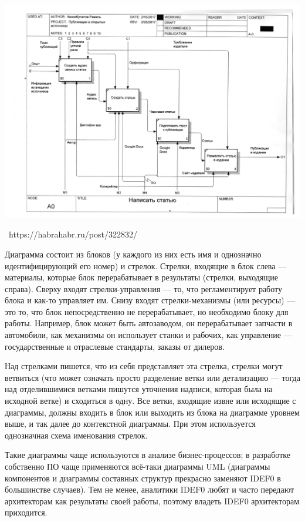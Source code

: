 \documentclass[a5paper]{article}
\newcommand{\attribution}[1] {
    \vspace{-5mm}\begin{flushright}\begin{scriptsize}%
    {\textcopyright\, #1}\end{scriptsize}\end{flushright}
}
\begin{document}
\begin{center}
    \includegraphics[width=\textwidth]{idef0.png}
    \attribution{https://habrahabr.ru/post/322832/}
\end{center}

Диаграмма состоит из блоков (у каждого из них есть имя и однозначно идентифицирующий его номер) и стрелок. Стрелки, входящие в блок слева --- материалы, которые блок перерабатывает в результаты (стрелки, выходящие справа). Сверху входят стрелки-управления --- то, что регламентирует работу блока и как-то управляет им. Снизу входят стрелки-механизмы (или ресурсы) --- это то, что блок непосредственно не перерабатывает, но необходимо блоку для работы. Например, блок может быть автозаводом, он перерабатывает запчасти в автомобили, как механизмы он использует станки и рабочих, как управление --- государственные и отраслевые стандарты, заказы от дилеров.

Над стрелками пишется, что из себя представляет эта стрелка, стрелки могут ветвиться (что может означать просто разделение ветки или детализацию --- тогда над отделившимися ветками пишутся уточнения надписи, которая была на исходной ветке) и сходиться в одну. Все ветки, входящие извне или исходящие с диаграммы, должны входить в блок или выходить из блока на диаграмме уровнем выше, и так далее до контекстной диаграммы. При этом используется однозначная схема именования стрелок.

Такие диаграммы чаще используются в анализе бизнес-процессов; в разработке собственно ПО чаще применяются всё-таки диаграммы UML (диаграммы компонентов и диаграммы составных структур прекрасно заменяют IDEF0 в большинстве случаев). Тем не менее, аналитики IDEF0 любят и часто передают архитекторам как результаты своей работы, поэтому владеть IDEF0 архитекторам приходится.
\end{document}
